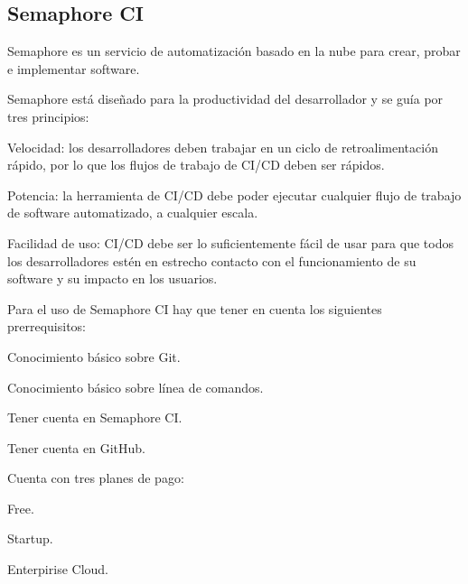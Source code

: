 \subsection{Semaphore CI}
Semaphore es un servicio de automatización basado en la nube para crear, probar e implementar software.

Semaphore está diseñado para la productividad del desarrollador y se guía por tres principios:
\begin{compactitem}
    \item Velocidad: los desarrolladores deben trabajar en un ciclo de retroalimentación rápido, por lo que los flujos de trabajo de CI/CD deben ser rápidos.
    \item Potencia: la herramienta de CI/CD debe poder ejecutar cualquier flujo de trabajo de software automatizado, a cualquier escala.
    \item Facilidad de uso: CI/CD debe ser lo suficientemente fácil de usar para que todos los desarrolladores estén en estrecho contacto con el funcionamiento de su software y su impacto en los usuarios.
\end{compactitem}

Para el uso de Semaphore CI hay que tener en cuenta los siguientes prerrequisitos:
\begin{compactitem}
    \item Conocimiento básico sobre Git.
    \item Conocimiento básico sobre línea de comandos.
    \item Tener cuenta en Semaphore CI.
    \item Tener cuenta en GitHub.
\end{compactitem}

Cuenta con tres planes de pago:
\begin{compactitem}
    \item Free.
    \item Startup.
    \item Enterpirise Cloud.
\end{compactitem}

